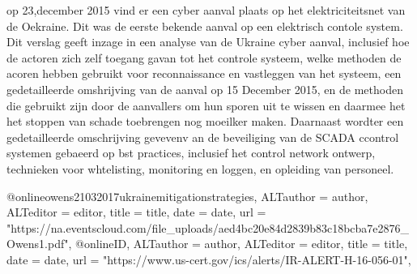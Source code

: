 {{{{{{{{{op 23,december 2015  vind er een cyber aanval plaats op het elektriciteitsnet van de Oekraine. Dit was de eerste bekende aanval op een elektrisch contole  system.  Dit verslag geeft inzage in een analyse van de Ukraine cyber aanval,
inclusief hoe de actoren zich zelf toegang gavan tot het controle systeem, welke methoden de acoren hebben gebruikt voor reconnaissance en vastleggen van het systeem, een gedetailleerde omshrijving van de aanval op 15 December 2015, en de methoden die gebruikt zijn door de aanvallers om hun sporen uit te wissen en daarmee het het stoppen van schade toebrengen  nog moeilker maken. Daarnaast wordter  een gedetailleerde omschrijving gevevenv an de beveiliging van de SCADA ccontrol systemen gebaeerd op bst practices, inclusief het control network ontwerp, technieken voor whtelisting, monitoring en loggen, en  opleiding van personeel.
\cite{Whitehead2017ukrainepoweroutage}

\cite{noauthor_2022-nm}
\cite{zetter2016GridHack}


@online{owens21032017ukrainemitigationstrategies,	ALTauthor = {author},	ALTeditor = {editor},	title = {title},	date = {date},	url = {"https://na.eventscloud.com/file_uploads/aed4bc20e84d2839b83c18bcba7e2876_Owens1.pdf"},}
@online{ID,	ALTauthor = {author},	ALTeditor = {editor},	title = {title},	date = {date},	url = {"https://www.us-cert.gov/ics/alerts/IR-ALERT-H-16-056-01"},}

}}}}}}}}}
